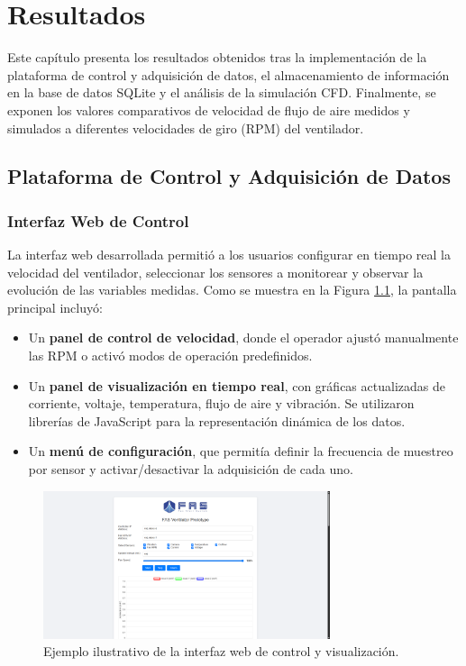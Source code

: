 \chapter{Resultados}

Este capítulo presenta los resultados obtenidos tras la implementación de la plataforma de control y adquisición de datos, el almacenamiento de información en la base de datos SQLite y el análisis de la simulación CFD. Finalmente, se exponen los valores comparativos de velocidad de flujo de aire medidos y simulados a diferentes velocidades de giro (RPM) del ventilador.

\section{Plataforma de Control y Adquisición de Datos}
\subsection{Interfaz Web de Control}
La interfaz web desarrollada permitió a los usuarios configurar en tiempo real la velocidad del ventilador, seleccionar los sensores a monitorear y observar la evolución de las variables medidas. Como se muestra en la Figura \ref{fig:ui_plataforma}, la pantalla principal incluyó:
\begin{itemize}
    \item Un \textbf{panel de control de velocidad}, donde el operador ajustó manualmente las RPM o activó modos de operación predefinidos.
    \item Un \textbf{panel de visualización en tiempo real}, con gráficas actualizadas de corriente, voltaje, temperatura, flujo de aire y vibración. Se utilizaron librerías de JavaScript para la representación dinámica de los datos.
    \item Un \textbf{menú de configuración}, que permitía definir la frecuencia de muestreo por sensor y activar/desactivar la adquisición de cada uno.
\end{itemize}

\begin{figure}[htbp]
    \centering
    \includegraphics[width=0.75\textwidth]{images/webb.png}
    \caption{Ejemplo ilustrativo de la interfaz web de control y visualización.}
    \label{fig:ui_plataforma}
\end{figure}

